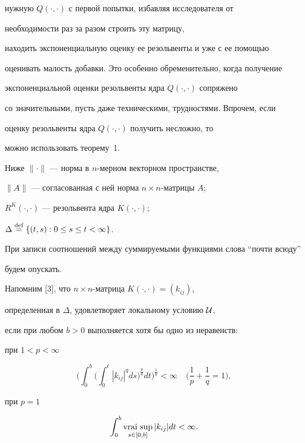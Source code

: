 нужную $Q(\cdot,\cdot)$ с первой попытки, избавляя исследователя от


необходимости раз за разом строить эту матрицу,


находить экспоненциальную оценку ее резольвенты и уже с ее помощью


оценивать малость добавки. Это особенно обременительно, когда получение


экспоненциальной оценки резольвенты ядра $Q(\cdot,\cdot)$ сопряжено


со значительными, пусть даже техническими, трудностями. Впрочем, если


оценку резольвенты ядра $Q(\cdot,\cdot)$ получить несложно, то


можно использовать теорему~1.





Ниже $\|\cdot\|$ --- норма в $n$-мерном векторном пространстве,


$\|A\|$ --- согласованная с ней норма $n\times n$-матрицы $A$; 


$R^K(\cdot,\cdot)$ --- резольвента ядра $K(\cdot,\cdot)$;


$\Delta\overset{\mathrm{def}}{=}\{(t,s):0\le s\le t<\infty\}$.


При записи соотношений между суммируемыми функциями слова ``почти всюду''


будем опускать.





Напомним [3], что $n\times n$-матрица $K(\cdot,\cdot)=(k_{ij})$,


определенная в $\Delta$, удовлетворяет локальному условию $\cal U$,


если при любом $b>0$ выполняется хотя бы одно из неравенств:\linebreak


при $1<p<\infty$


$$


\biggl(\int_0^b\biggl(\int_0^t|k_{ij}|^q ds


\biggr)^{\frac{p}{q}}dt\biggr)^{\frac{1}{p}}


<\infty\quad


\biggl(\frac{1}{p}+\frac{1}{q}=1\biggr),


$$


при $p=1$


$$


\int_0^b\vraisup\limits_{s\in[0,b]}|k_{ij}|dt<\infty.


$$





